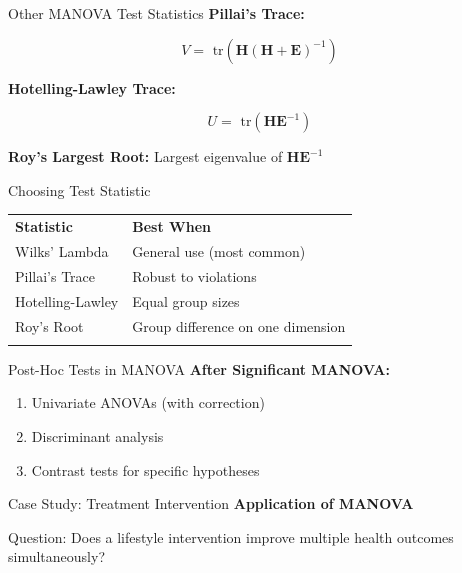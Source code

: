 \documentclass[aspectratio=169,ignorenonframetext]{beamer}
\begin{document}
\begin{frame}{Other MANOVA Test Statistics}
\textbf{Pillai's Trace:}

\[V = \text{ tr}\left( {\mathbf{H}(\mathbf{H} + \mathbf{E})}^{- 1} \right)\]

\textbf{Hotelling-Lawley Trace:}

\[U = \text{ tr}\left( \mathbf{H}\mathbf{E}^{- 1} \right)\]

\textbf{Roy's Largest Root:} Largest eigenvalue of
\(\mathbf{H}\mathbf{E}^{- 1}\)
\end{frame}

\begin{frame}{Choosing Test Statistic}
{\def\LTcaptype{none} %
\begin{longtable}[]{@{}
  >{\raggedright\arraybackslash}p{}
  >{\raggedright\arraybackslash}p{}@{}}
\toprule\noalign{}
\endhead
\textbf{Statistic} & \textbf{Best When} \\
Wilks' Lambda & General use (most common) \\
Pillai's Trace & Robust to violations \\
Hotelling-Lawley & Equal group sizes \\
Roy's Root & Group difference on one dimension \\
\bottomrule\noalign{}
\end{longtable}
}
\end{frame}

\begin{frame}{Post-Hoc Tests in MANOVA}
\textbf{After Significant MANOVA:}

\begin{enumerate}
\item
  Univariate ANOVAs (with correction)
\item
  Discriminant analysis
\item
  Contrast tests for specific hypotheses
\end{enumerate}
\end{frame}

\begin{frame}{Case Study: Treatment Intervention}
\textbf{Application of MANOVA}

Question: Does a lifestyle intervention improve multiple health outcomes
simultaneously?
\end{frame}
\end{document}
